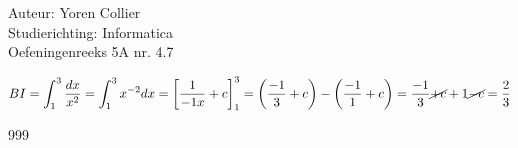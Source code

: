 \documentclass[a4paper]{article}
\newcommand{\Lh}{\left(} %
\newcommand{\Rh}{\right)}
\newcommand{\Lv}{\left[} %
\newcommand{\Rv}{\right]}
\newcommand{\schrap}{\cancel}
\newcommand{\intgrl}{\displaystyle\int} %
\begin{document}
\noindent \large Auteur: Yoren Collier \\
\noindent \large Studierichting: Informatica\\
\noindent \large Oefeningenreeks 5A nr. 4.7\\

\medskip

\normalsize

$ BI = \intgrl_1^3 \dfrac{dx}{x^2} = \intgrl_1^3 x^{-2} dx  = \Lv \dfrac{1}{-1x} +c \Rv_1^3 = \Lh \dfrac{-1}{3} +c \Rh - \Lh \dfrac{-1}{1} +c \Rh = \dfrac{-1}{3} \schrap{+c} + 1 \schrap{-c} =\dfrac{2}{3}$\\

\begin{thebibliography}{999}
\end{thebibliography}
\end{document}
